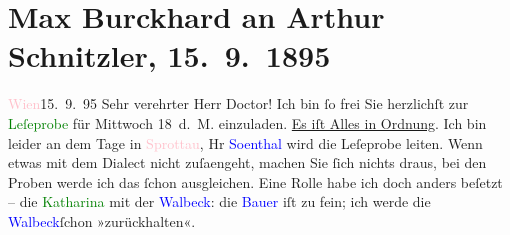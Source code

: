 

               \section[Max Burckhard an Arthur Schnitzler, 15. 9. 1895]{ Max Burckhard an Arthur Schnitzler, 15. 9. 1895}\nopagebreak{}\rehead{ }\normalsize\beginnumbering{} \toendnotes[C]{\smallbreak\pagebreak[2]} 
\toendnotes[C]{\smallbreak}\pstart
           \noindent{}{\pb}\textcolor{gray}{\textbf{\textcolor{brown}{\label{T_L00484-1v}\label{T_L00484-1h}}{}\ledrightnote{\textcolor{brown}{Burgtheater}}}}\hfill \textcolor{pink}{Wien}{}\ledrightnote{\textcolor{pink}{Wien}}{ }15. 9. 95\pend
           \pstart{}Sehr verehrter Herr Doctor!\pend\pstart
           Ich bin ſo frei Sie herzlichſt zur \textcolor{green}{Leſeprobe}{} für Mittwoch 18 d. M. einzuladen. \uline{Es iſt Alles in Ordnung}. Ich bin leider an dem
                    Tage in \textcolor{pink}{Sprottau}{}\ledrightnote{\textcolor{pink}{Sprottau}}, Hr \textcolor{blue}{So{\geminationn}enthal}{}\ledrightnote{\textcolor{blue}{Adolf von Sonnenthal}} wird die Leſeprobe
                    leiten. Wenn etwas mit dem Dialect nicht zuſa{\geminationm}engeht, machen Sie ſich nichts draus, bei den Proben werde ich das ſchon
                    ausgleichen. Eine Rolle habe ich doch anders beſetzt – die \textcolor{green}{Katharina}{} mit der \textcolor{blue}{Walbeck}{}\ledrightnote{\textcolor{blue}{Fanny Walbeck}}: die \textcolor{blue}{Bauer}{}\ledrightnote{\textcolor{blue}{Anna Bauer}}
                    iſt zu fein; ich werde die \textcolor{blue}{Walbeck}{}\ledrightnote{\textcolor{blue}{Fanny Walbeck}}{ }ſchon »zurückhalten«.\pend
